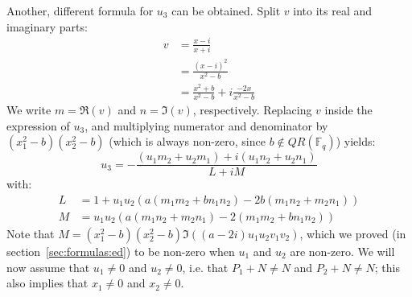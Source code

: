 \documentclass{llncs}
\newcommand{\QR}{QR}
\newcommand{\bF}{\mathbb{F}}
\begin{document}
Another, different formula for $u_3$ can be obtained. Split $v$ into
its real and imaginary parts:
\begin{align*}
    v &= \frac{x - i}{x + i} \\
    &= \frac{(x - i)^2}{x^2 - b} \\
    &= \frac{x^2 + b}{x^2 - b} + i\frac{-2x}{x^2 - b}
\end{align*}
We write $m = \Re(v)$ and $n = \Im(v)$, respectively. Replacing $v$
inside the expression of $u_3$, and multiplying numerator and
denominator by $(x_1^2 - b)(x_2^2 - b)$ (which is always non-zero, since
$b \notin \QR(\bF_q)$) yields:
\begin{equation*}
    u_3 = -\frac{(u_1 m_2 + u_2 m_1) + i (u_1 n_2 + u_2 n_1)}{L+iM}
\end{equation*}
with:
\begin{align*}
    L &= 1 + u_1 u_2 (a(m_1 m_2 + b n_1 n_2) - 2b (m_1 n_2 + m_2 n_1)) \\
    M &= u_1 u_2 (a(m_1 n_2 + m_2 n_1) - 2 (m_1 m_2 + b n_1 n_2))
\end{align*}
Note that $M = (x_1^2 - b)(x_2^2 - b)\Im((a - 2i) u_1 u_2 v_1 v_2)$, which
we proved (in section~\ref{sec:formulas:ed}) to be non-zero when $u_1$ and
$u_2$ are non-zero. We will now assume that $u_1 \neq 0$ and $u_2 \neq 0$,
i.e. that $P_1+N \neq N$ and $P_2+N \neq N$; this also implies that
$x_1 \neq 0$ and $x_2 \neq 0$.
\end{document}
